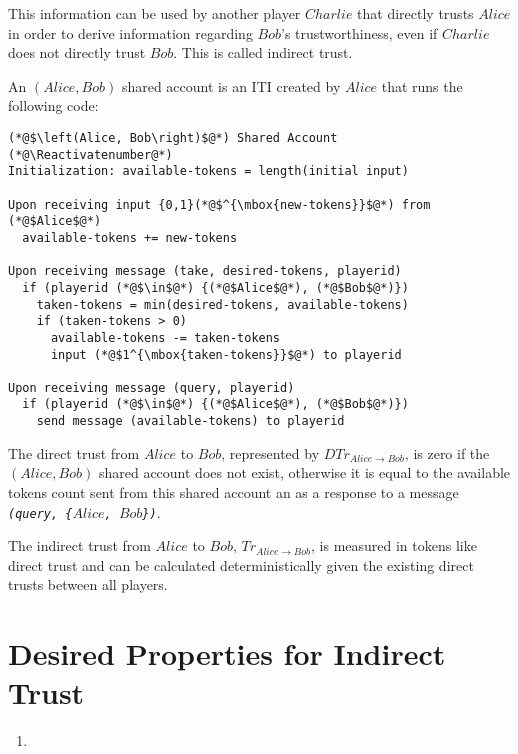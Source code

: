   This information can be used by another player $Charlie$ that directly trusts $Alice$ in order to derive information
  regarding $Bob$'s trustworthiness, even if $Charlie$ does not directly trust $Bob$. This is called indirect trust.

  \begin{definition}
    An $\left(Alice, Bob\right)$ shared account is an ITI created by $Alice$ that runs the following code:
  \end{definition}
  \Suppressnumber
  \begin{lstlisting}[label=sharedaccount, style=numbers]
(*@$\left(Alice, Bob\right)$@*) Shared Account
(*@\Reactivatenumber@*)
Initialization: available-tokens = length(initial input)

Upon receiving input {0,1}(*@$^{\mbox{new-tokens}}$@*) from (*@$Alice$@*)
  available-tokens += new-tokens

Upon receiving message (take, desired-tokens, playerid)
  if (playerid (*@$\in$@*) {(*@$Alice$@*), (*@$Bob$@*)})
    taken-tokens = min(desired-tokens, available-tokens)
    if (taken-tokens > 0)
      available-tokens -= taken-tokens
      input (*@$1^{\mbox{taken-tokens}}$@*) to playerid

Upon receiving message (query, playerid)
  if (playerid (*@$\in$@*) {(*@$Alice$@*), (*@$Bob$@*)})
    send message (available-tokens) to playerid
  \end{lstlisting}
  \begin{definition}
    The direct trust from $Alice$ to $Bob$, represented by $DTr_{Alice \rightarrow Bob}$, is zero if the $\left(Alice,
    Bob\right)$ shared account does not exist, otherwise it is equal to the available tokens count sent from this shared
    account an as a response to a message \emph{\texttt{(query, \{}$Alice$\texttt{, }$Bob$\texttt{\})}}.
  \end{definition}

  \begin{definition}
    The indirect trust from $Alice$ to $Bob$, $Tr_{Alice \rightarrow Bob}$, is measured in tokens like direct trust and can be
    calculated deterministically given the existing direct trusts between all players.
  \end{definition}

\section{Desired Properties for Indirect Trust}
  \begin{enumerate}
    \item 
  \end{enumerate}
